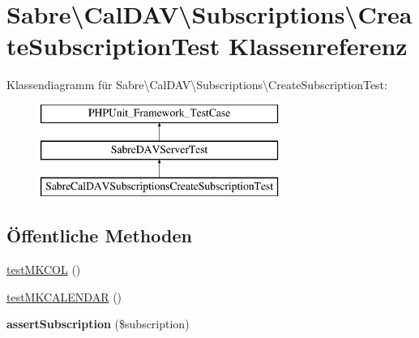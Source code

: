\hypertarget{class_sabre_1_1_cal_d_a_v_1_1_subscriptions_1_1_create_subscription_test}{}\section{Sabre\textbackslash{}Cal\+D\+AV\textbackslash{}Subscriptions\textbackslash{}Create\+Subscription\+Test Klassenreferenz}
\label{class_sabre_1_1_cal_d_a_v_1_1_subscriptions_1_1_create_subscription_test}
Klassendiagramm für Sabre\textbackslash{}Cal\+D\+AV\textbackslash{}Subscriptions\textbackslash{}Create\+Subscription\+Test\+:\begin{figure}[H]
\begin{center}
\leavevmode
\includegraphics[height=3.000000cm]{class_sabre_1_1_cal_d_a_v_1_1_subscriptions_1_1_create_subscription_test}
\end{center}
\end{figure}
\subsection*{Öffentliche Methoden}
\begin{DoxyCompactItemize}
\item 
\mbox{\hyperlink{class_sabre_1_1_cal_d_a_v_1_1_subscriptions_1_1_create_subscription_test_a466e9c79d209d5bbba893c116ee74979}{test\+M\+K\+C\+OL}} ()
\item 
\mbox{\hyperlink{class_sabre_1_1_cal_d_a_v_1_1_subscriptions_1_1_create_subscription_test_a7c1035476e9c7b67cfa451952cf05655}{test\+M\+K\+C\+A\+L\+E\+N\+D\+AR}} ()
\item 
\mbox{\label{class_sabre_1_1_cal_d_a_v_1_1_subscriptions_1_1_create_subscription_test_a197e3c31fefd2a516213d33d15b1829b}} 
{\bfseries assert\+Subscription} (\$subscription)
\end{DoxyCompactItemize}
